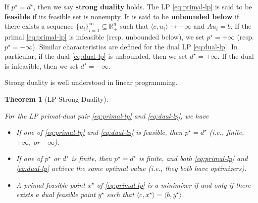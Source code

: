 \documentclass[
]{book}
\newtheorem{theorem}{Theorem}[chapter]
\theoremstyle{definition}
\theoremstyle{definition}
\theoremstyle{definition}
\theoremstyle{definition}
\theoremstyle{remark}
\begin{document}
If \(p^\star = d^\star\), then we say \textbf{strong duality} holds. The LP \eqref{eq:primal-lp} is said to be \textbf{feasible} if its feasible set is nonempty. It is said to be \textbf{unbounded below} if there exists a sequence \(\{ u_i \}_{i=1}^{\infty} \subseteq \mathbb{R}^{n}_{+}\) such that \(\langle c, u_i \rangle \rightarrow -\infty\) and \(A u_i = b\). If the primal \eqref{eq:primal-lp} is infeasible (resp. unbounded below), we set \(p^\star = + \infty\) (resp. \(p^\star = - \infty\)). Similar characteristics are defined for the dual LP \eqref{eq:dual-lp}. In particular, if the dual \eqref{eq:dual-lp} is unbounded, then we set \(d^\star = + \infty\). If the dual is infeasible, then we set \(d^\star = - \infty\).

Strong duality is well understood in linear programming.

\begin{theorem}[LP Strong Duality]
\protect\hypertarget{thm:LPStrongDuality}{}\label{thm:LPStrongDuality}

For the LP primal-dual pair \eqref{eq:primal-lp} and \eqref{eq:dual-lp}, we have

\begin{itemize}
\item
  If one of \eqref{eq:primal-lp} and \eqref{eq:dual-lp} is feasible, then \(p^\star = d^\star\) (i.e., finite, \(+\infty\), or \(-\infty\)).
\item
  If one of \(p^\star\) or \(d^\star\) is finite, then \(p^\star = d^\star\) is finite, and both \eqref{eq:primal-lp} and \eqref{eq:dual-lp} achieve the same optimal value (i.e., they botb have optimizers).
\item
  A primal feasible point \(x^\star\) of \eqref{eq:primal-lp} is a minimizer if and only if there exists a dual feasible point \(y^\star\) such that \(\langle c, x^\star \rangle = \langle b, y^\star \rangle\).
\end{itemize}

\end{theorem}
\end{document}
